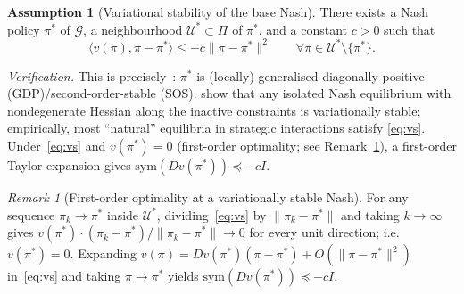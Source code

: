 \documentclass[11pt]{article}
\theoremstyle{definition}
\newtheorem{assumption}{Assumption}
\theoremstyle{remark}
\newtheorem{remark}[theorem]{Remark}
\newcommand{\sym}{\mathrm{sym}}
\begin{document}
\begin{assumption}[Variational stability of the base Nash]\label{ass:stability}
There exists a Nash policy $\pi^*$ of $\mathcal G$, a neighbourhood
$\mathcal U^*\subset\Pi$ of $\pi^*$, and a constant $c>0$ such that
\begin{equation}
  \langle v(\pi),\pi-\pi^*\rangle\le -c\|\pi-\pi^*\|^2\qquad\forall\pi\in\mathcal U^*\setminus\{\pi^*\}.
  \label{eq:vs}
\end{equation}
\end{assumption}

\emph{Verification.}  This is precisely~\citet[Def.~2]{giannou2022convergence}:
$\pi^*$ is (locally) generalised-diagonally-positive
(GDP)/second-order-stable (SOS).  \citet[Appx.~A]{giannou2022convergence}
show that any isolated Nash equilibrium with nondegenerate Hessian
along the inactive constraints is variationally stable; empirically,
most ``natural'' equilibria in strategic interactions satisfy
\eqref{eq:vs}.  Under~\eqref{eq:vs} and $v(\pi^*)=0$ (first-order
optimality; see Remark~\ref{rem:firstorder}), a first-order Taylor
expansion gives $\sym(Dv(\pi^*))\preceq -cI$.

\begin{remark}[First-order optimality at a variationally stable
Nash]\label{rem:firstorder}
For any sequence $\pi_k\to\pi^*$ inside $\mathcal U^*$,
dividing~\eqref{eq:vs} by $\|\pi_k-\pi^*\|$ and taking $k\to\infty$
gives $v(\pi^*)\cdot(\pi_k-\pi^*)/\|\pi_k-\pi^*\|\to 0$ for every
unit direction; i.e.\ $v(\pi^*)=0$.  Expanding
$v(\pi)=Dv(\pi^*)(\pi-\pi^*)+O(\|\pi-\pi^*\|^2)$
in~\eqref{eq:vs} and taking $\pi\to\pi^*$ yields
$\sym(Dv(\pi^*))\preceq -c I$.
\end{remark}
\end{document}
